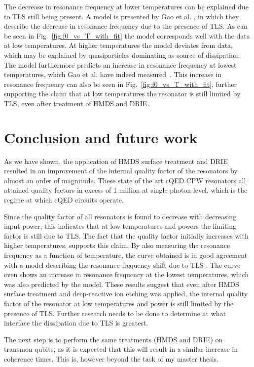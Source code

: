The decrease in resonance frequency at lower temperatures can be explained due to TLS still being present. A model is presented by Gao et al. \cite{gao2008experimental}, in which they describe the decrease in resonance frequency due to the presence of TLS. As can be seen in Fig.~\ref{fig:f0_vs_T_with_fit} the model corresponds well with the data at low temperatures. At higher temperatures the model deviates from data, which may be explained by quasiparticles dominating as source of dissipation. The model furthermore predicts an increase in resonance frequency at lowest temperatures, which Gao et al. have indeed measured~\cite{gao2008experimental}. This increase in resonance frequency can also be seen in Fig.~\ref{fig:f0_vs_T_with_fit}, further supporting the claim that at low temperatures the resonator is still limited by TLS, even after treatment of HMDS and DRIE.



\chapter{Conclusion and future work}

As we have shown, the application of HMDS surface treatment and DRIE resulted in an improvement of the internal quality factor of the resonators by almost an order of magnitude. These state of the art cQED CPW resonators all attained quality factors in excess of 1 million at single photon level, which is the regime at which cQED circuits operate.

Since the quality factor of all resonators is found to decrease with decreasing input power, this indicates that at low temperatures and powers the limiting factor is still due to TLS. The fact that the quality factor initially increases with higher temperatures, supports this claim. By also measuring  the resonance frequency as a function of temperature, the curve obtained is in good agreement with a model describing the resonance frequency shift due to TLS \cite{gao2008experimental}. The curve even shows an increase in resonance frequency at the lowest temperatures, which was also predicted by the model. These results suggest that even after HMDS surface treatment and deep-reactive ion etching was applied, the internal quality factor of the resonator at low temperatures and power is still limited by the presence of TLS. Further research needs to be done to determine at what interface the dissipation due to TLS is greatest.

The next step is to perform the same treatments (HMDS and DRIE) on transmon qubits, as it is expected that this will result in a similar increase in coherence times. This is, however beyond the task of my master thesis.
